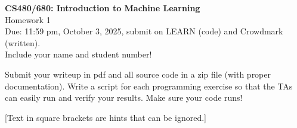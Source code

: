 \documentclass[10pt,letter,notitlepage]{article}
\newcounter{exercise}
\begin{document}
\begin{center}
  \large{\textbf{CS480/680: Introduction to Machine Learning} \\ Homework 1\\ Due: 11:59 pm, October 3, 2025, submit on LEARN (code) and Crowdmark (written).} \\

Include your name and student number!

\end{center}

\begin{center}
Submit your writeup in pdf and all source code in a zip file (with proper documentation). Write a script for each programming exercise so that the TAs can easily run and verify your results. Make sure your code runs!

[Text in square brackets are hints that can be ignored.]
\end{center}
\end{document}
